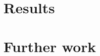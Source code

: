 \documentclass[11pt,a4paper]{article}
\begin{document}


\section{Results}



\section{Further work}


\newpage
\end{document}
